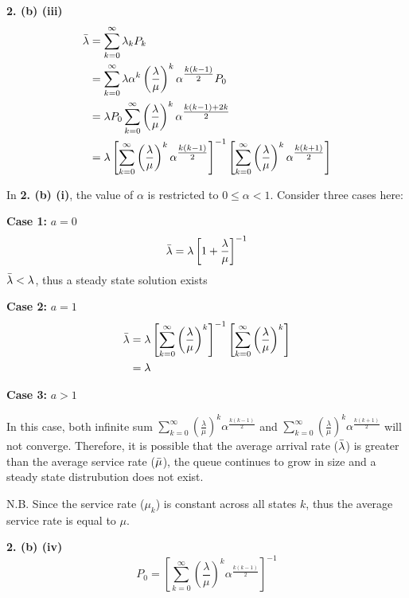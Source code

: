 \documentclass[12pt, a4paper]{article}
\begin{document}
\vspace{1cm}
\noindent\textbf{2. (b) (iii)}
\begin{align*}
 \Bar{\lambda} &= \sum_{k=0}^{\infty} \lambda_kP_k \\
 &= \sum_{k=0}^{\infty} \lambda\alpha^k \left(\frac{\lambda}{\mu}\right)^k \alpha^{\textstyle\frac{k(k-1)}{2}}P_0 \\
 &= \lambda P_0 \sum_{k=0}^{\infty} \left(\frac{\lambda}{\mu}\right)^k \alpha^{\textstyle\frac{k(k-1) + 2k}{2}} \\
 &= \lambda \left[\sum_{k=0}^{\infty} \left(\frac{\lambda}{\mu}\right)^k\alpha^{\textstyle\frac{k(k-1)}{2}}\right]^{-1} \left[\sum_{k=0}^{\infty} \left(\frac{\lambda}{\mu}\right)^k \alpha^{\textstyle\frac{k(k+1)}{2}}\right]
\end{align*}

\noindent In \textbf{2. (b) (i)}, the value of \(\alpha\) is restricted to \(0 \leq \alpha < 1\). Consider three cases here:

\noindent \textbf{Case 1:} \(a = 0\)
\[\Bar{\lambda} = \lambda \left[1 + \frac{\lambda}{\mu}\right]^{-1}\]
\(\Bar{\lambda} < \lambda\), thus a steady state solution exists

\noindent \textbf{Case 2:} \(a = 1\)
\begin{align*}
   \Bar{\lambda} &= \lambda \left[\sum_{k=0}^{\infty} \left(\frac{\lambda}{\mu}\right)^k\right]^{-1} \left[\sum_{k=0}^{\infty} \left(\frac{\lambda}{\mu}\right)^k \right] \\
   &= \lambda
\end{align*}

\noindent \textbf{Case 3:} \(a > 1\)

In this case, both infinite sum \(\sum_{k=0}^{\infty} \left(\frac{\lambda}{\mu}\right)^k\alpha^{\textstyle\frac{k(k-1)}{2}}\) and \(\sum_{k=0}^{\infty} \left(\frac{\lambda}{\mu}\right)^k \alpha^{\textstyle\frac{k(k+1)}{2}}\) will not converge. Therefore, it is possible that the average arrival rate (\(\Bar{\lambda}\)) is greater than the average service rate (\(\Bar{\mu}\)), the queue continues to grow in size and a steady state distrubution does not exist.

N.B. Since the service rate (\(\mu_k\)) is constant across all states \(k\), thus the average service rate is equal to \(\mu\).

\vspace{1cm}
\noindent\textbf{2. (b) (iv)}
\[P_0 = \left[\sum_{k=0}^{\infty} \left(\frac{\lambda}{\mu}\right)^k\alpha^{\textstyle\frac{k(k-1)}{2}}\right]^{-1}\]
\end{document}
